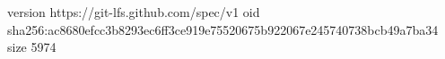 version https://git-lfs.github.com/spec/v1
oid sha256:ac8680efcc3b8293ec6ff3ce919e75520675b922067e245740738bcb49a7ba34
size 5974
